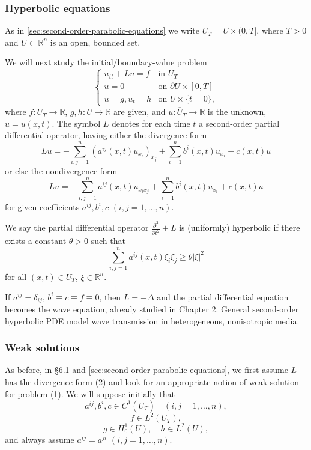 \subsubsection{Hyperbolic equations}

As in \cref{sec:second-order-parabolic-equations} we write $U_T = U \times (0, T]$, where $T > 0$ and $U \subset \mathbb{R}^n$ is an open, bounded set.

We will next study the initial/boundary-value problem
\[
\begin{cases}
u_{tt} + Lu = f & \text{in } U_T \\
u = 0 & \text{on } \partial U \times [0,T] \\
u = g, u_t = h & \text{on } U \times \{t = 0\},
\end{cases}
\tag{1}
\]
where $f : U_T \to \mathbb{R}$, $g, h : U \to \mathbb{R}$ are given, and $u : \overline{U}_T \to \mathbb{R}$ is the unknown, $u = u(x,t)$. The symbol $L$ denotes for each time $t$ a second-order partial differential operator, having either the divergence form
\[
Lu = -\sum_{i,j=1}^{n} (a^{ij}(x,t)u_{x_i})_{x_j} + \sum_{i=1}^{n} b^i(x,t)u_{x_i} + c(x,t)u
\tag{2}
\]
or else the nondivergence form
\[
Lu = -\sum_{i,j=1}^{n} a^{ij}(x,t)u_{x_i x_j} + \sum_{i=1}^{n} b^i(x,t)u_{x_i} + c(x,t)u
\tag{3}
\]
for given coefficients $a^{ij}, b^i, c$ $(i,j = 1,\ldots,n)$.

\begin{definition}
\label{def:uniform-hyperbolicity}
We say the partial differential operator $\frac{\partial^2}{\partial t^2} + L$ is (uniformly) hyperbolic if there exists a constant $\theta > 0$ such that
\[
\sum_{i,j=1}^{n} a^{ij}(x,t)\xi_i\xi_j \geq \theta|\xi|^2
\tag{4}
\]
for all $(x,t) \in U_T$, $\xi \in \mathbb{R}^n$.
\end{definition}

If $a^{ij} = \delta_{ij}$, $b^i \equiv c \equiv f \equiv 0$, then $L = -\Delta$ and the partial differential equation becomes the wave equation, already studied in Chapter 2. General second-order hyperbolic PDE model wave transmission in heterogeneous, nonisotropic media.

\subsubsection{Weak solutions}

As before, in \S6.1 and \cref{sec:second-order-parabolic-equations}, we first assume $L$ has the divergence form (2) and look for an appropriate notion of weak solution for problem (1). We will suppose initially that
\[
a^{ij}, b^i, c \in C^1(\overline{U}_T) \quad (i,j = 1,\ldots,n),
\tag{5}
\]
\[
f \in L^2(U_T),
\tag{6}
\]
\[
g \in H_0^1(U), \quad h \in L^2(U),
\tag{7}
\]
and always assume $a^{ij} = a^{ji}$ $(i,j = 1,\ldots,n)$.

